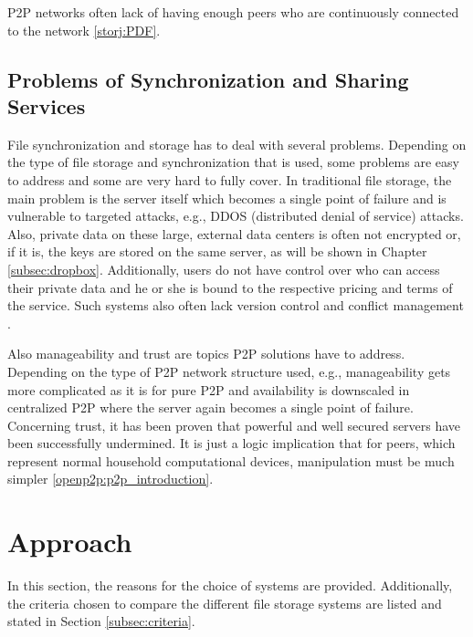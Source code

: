 P2P networks often lack of having enough peers who are continuously connected to the network \ref{storj:PDF}.

\subsection{Problems of Synchronization and Sharing Services}
File synchronization and storage has to deal with several problems. Depending on the type of file storage and synchronization that is used, some problems are easy to address and some are very hard to fully cover. In traditional file storage, the main problem is the server itself which becomes a single point of failure and is vulnerable to targeted attacks, e.g., DDOS (distributed denial of service) attacks. Also, private data on these large, external data centers is often not encrypted or, if it is, the keys are stored on the same server, as will be shown in Chapter \ref{subsec:dropbox}. Additionally, users do not have control over who can access their private data and he or she is bound to the respective pricing and terms of the service. Such systems also often lack version control and conflict management \cite{hive2hive}.

Also manageability and trust are topics P2P solutions have to address. Depending on the type of P2P network structure used, e.g., manageability gets more complicated as it is for pure P2P and availability is downscaled in centralized P2P where the server again becomes a single point of failure. Concerning trust, it has been proven that powerful and well secured servers have been successfully undermined. It is just a logic implication that for peers, which represent normal household computational devices, manipulation must be much simpler \ref{openp2p:p2p_introduction}.

\section{Approach}
\label{sec:approach}
In this section, the reasons for the choice of systems are provided. Additionally, the criteria chosen to compare the different file storage systems are listed and stated in Section \ref{subsec:criteria}.

